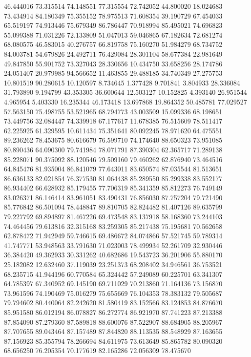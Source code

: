 46.444016
73.315514
74.148551
77.315554
72.742052
44.800020
18.024683
73.434914
84.180349
75.355152
78.975513
71.608354
39.190729
67.454033
65.519197
74.913446
75.679349
86.786447
70.918994
85.495021
74.696823
55.099388
71.031226
72.133809
51.047013
59.046865
67.182634
72.681274
68.080575
46.583015
40.276757
66.819758
75.160270
51.984279
68.734752
84.003781
54.679826
24.492711
76.429084
28.301104
58.677384
22.981649
49.847850
55.901752
73.327043
28.330656
10.434750
33.658256
28.174786
24.051407
20.979985
94.566652
11.463855
29.488185
34.740349
27.275753
10.801519
90.280615
10.120597
8.734645
1.377428
9.701841
3.804933
28.336084
31.793890
9.194799
43.353305
36.600644
12.503127
10.152825
4.393140
26.951544
4.965954
5.403330
16.235344
46.173418
13.697868
19.864352
50.485781
77.029527
57.563150
75.498755
53.521965
68.794773
43.003509
15.099336
68.198651
73.449756
32.084447
74.339918
67.177617
11.678385
76.515609
78.511417
62.225925
61.329595
10.611434
75.351641
80.092245
78.971620
64.475551
89.236262
78.453675
80.616679
76.599710
74.174640
88.650323
73.951085
80.890436
64.090300
79.741984
78.071791
87.390304
62.365717
71.289138
85.228071
90.375092
88.120546
79.509160
79.460262
62.876940
73.464516
64.845476
81.935004
86.841079
77.643011
83.650574
87.035544
81.513651
86.636133
82.021854
76.377530
81.064438
85.289550
85.299338
83.552177
86.934402
66.628932
85.179455
77.706319
85.341359
85.812273
76.749149
83.026371
86.146414
83.961051
83.490431
76.856030
87.757204
79.721490
85.776842
86.501094
78.448847
89.810705
82.824482
81.407126
89.635799
79.227792
69.894897
81.467226
69.473548
83.137918
58.168360
73.244103
74.464456
79.613816
32.315168
83.259305
85.217438
75.195681
70.562658
62.878472
71.942949
59.746615
69.486672
84.074866
57.521745
59.789314
41.747771
53.948563
33.791630
71.023003
78.499934
52.261709
32.930446
36.384420
49.362933
30.331262
40.682686
19.543723
36.201906
55.880170
25.182082
12.632460
37.119039
23.251373
68.208402
34.946561
36.753521
68.235715
41.944196
60.770584
65.324442
57.249089
60.225701
63.341307
64.785397
67.340952
69.145190
69.711029
70.213860
71.164136
73.156870
73.961596
74.190469
75.016279
75.655669
76.104353
78.383132
79.505687
79.794602
80.440064
82.242620
81.580419
83.152566
83.124853
84.876670
85.951580
86.012194
86.078827
86.272774
86.921970
87.741223
87.213388
87.854090
87.279360
87.589818
88.600076
87.522907
88.684905
88.205967
87.707655
89.043464
87.157489
87.844820
88.113535
88.548929
87.163655
87.156923
85.355794
78.266694
84.611975
73.613649
85.865782
80.090320
68.656250
76.205354
70.177619
82.165286
72.056309
78.475670
